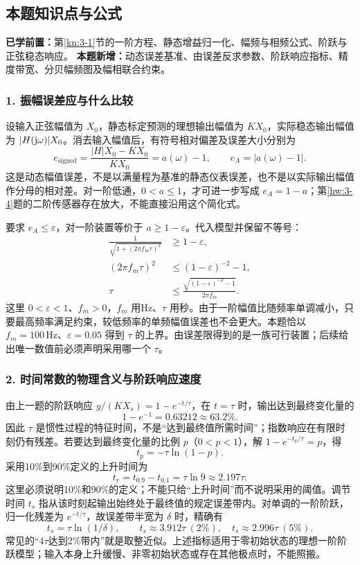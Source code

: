 \subsection*{本题知识点与公式}
\label{kn:3-2}
\noindent\textbf{已学前置：}第\ref{kn:3-1}节的一阶方程、静态增益归一化、幅频与相频公式、阶跃与正弦稳态响应。
\textbf{本题新增：}动态误差基准、由误差反求参数、阶跃响应指标、精度带宽、分贝幅频图及幅相联合约束。

\subsubsection*{1. 振幅误差应与什么比较}
设输入正弦幅值为 $X_0$，静态标定预测的理想输出幅值为 $KX_0$，实际稳态输出幅值为 $|H(\mathrm{j}\omega)|X_0$。消去输入幅值后，有符号相对偏差及误差大小分别为
\[
e_{\mathrm{signed}}=\frac{|H|X_0-KX_0}{KX_0}=a(\omega)-1,
\qquad e_A=|a(\omega)-1|.
\]
这是动态幅值误差，不是以满量程为基准的静态仪表误差，也不是以实际输出幅值作分母的相对差。对一阶低通，$0<a\leq1$，才可进一步写成 $e_A=1-a$；第\ref{hw:3-4}题的二阶传感器存在放大，不能直接沿用这个简化式。

要求 $e_A\leq\varepsilon$，对一阶装置等价于 $a\geq1-\varepsilon$。代入模型并保留不等号：
\begin{align*}
\frac{1}{\sqrt{1+(2\pi f_m\tau)^2}}&\geq1-\varepsilon,\\
(2\pi f_m\tau)^2&\leq(1-\varepsilon)^{-2}-1,\\
\tau&\leq\frac{\sqrt{(1-\varepsilon)^{-2}-1}}{2\pi f_m}.
\end{align*}
这里 $0<\varepsilon<1$、$f_m>0$，$f_m$ 用Hz、$\tau$ 用秒。由于一阶幅值比随频率单调减小，只要最高频率满足约束，较低频率的单频幅值误差也不会更大。本题恰以 $f_m=100\,\mathrm{Hz}$、$\varepsilon=0.05$ 得到 $\tau$ 的上界。由误差限得到的是一族可行装置；后续给出唯一数值前必须声明采用哪一个 $\tau$。

\subsubsection*{2. 时间常数的物理含义与阶跃响应速度}
由上一题的阶跃响应 $y/(KX_s)=1-e^{-t/\tau}$，在 $t=\tau$ 时，输出达到最终变化量的
\[
1-e^{-1}=0.63212\approx63.2\%.
\]
因此 $\tau$ 是惯性过程的特征时间，不是“达到最终值所需时间”；指数响应在有限时刻仍有残差。若要达到最终变化量的比例 $p$（$0<p<1$），解 $1-e^{-t_p/\tau}=p$，得
\[
t_p=-\tau\ln(1-p).
\]
采用10\%到90\%定义的上升时间为
\[
t_r=t_{0.9}-t_{0.1}=\tau\ln9\approx2.197\tau.
\]
这里必须说明10\%和90\%的定义；不能只给“上升时间”而不说明采用的阈值。调节时间 $t_s$ 指从该时刻起输出始终处于最终值的规定误差带内。对单调的一阶阶跃，归一化残差为 $e^{-t/\tau}$，故误差带半宽为 $\delta$ 时，精确有
\[
t_s=\tau\ln(1/\delta),\qquad
t_s\approx3.912\tau\ (2\%),\quad
t_s\approx2.996\tau\ (5\%).
\]
常见的“$4\tau$达到2\%带内”就是取整近似。上述指标适用于零初始状态的理想一阶阶跃模型；输入本身上升缓慢、非零初始状态或存在其他极点时，不能照搬。

